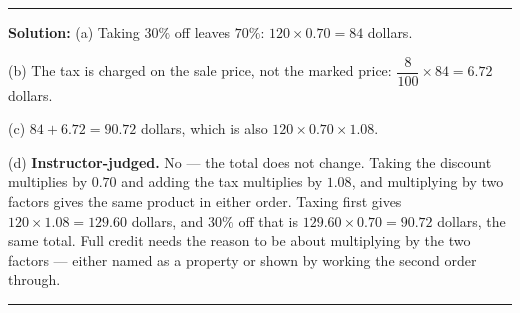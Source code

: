 \documentclass[12pt]{article}
\begin{document}
\vspace{0.25cm}\noindent\rule{\linewidth}{0.2pt}\vspace{0.25cm}


\textbf{Solution:} (a) Taking $30\%$ off leaves $70\%$:
$120 \times 0.70 = 84$ dollars. 

(b) The tax is charged on the sale price, not the marked price:
$\dfrac{8}{100} \times 84 = 6.72$ dollars. 

(c) $84 + 6.72 = 90.72$ dollars, which is also
$120 \times 0.70 \times 1.08$. 

(d) \textbf{Instructor-judged.} No --- the total does not change. Taking the
discount multiplies by $0.70$ and adding the tax multiplies by $1.08$, and
multiplying by two factors gives the same product in either order. Taxing first
gives $120 \times 1.08 = 129.60$ dollars, and $30\%$ off that is
$129.60 \times 0.70 = 90.72$ dollars, the same total. Full credit needs the
reason to be about multiplying by the two factors --- either named as a property
or shown by working the second order through.

\vspace{0.25cm}\noindent\rule{\linewidth}{0.2pt}\vspace{0.25cm}
\end{document}

